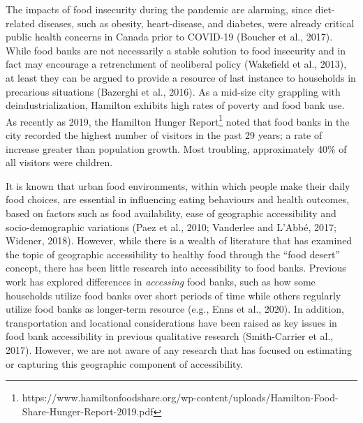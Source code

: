 \documentclass[]{elsarticle} %
\begin{document}
The impacts of food insecurity during the pandemic are alarming, since
diet-related diseases, such as obesity, heart-disease, and diabetes,
were already critical public health concerns in Canada prior to COVID-19
(Boucher et al., 2017). While food banks are not necessarily a stable
solution to food insecurity and in fact may encourage a retrenchment of
neoliberal policy (Wakefield et al., 2013), at least they can be argued
to provide a resource of last instance to households in precarious
situations (Bazerghi et al., 2016). As a mid-size city grappling with
deindustrialization, Hamilton exhibits high rates of poverty and food
bank use. As recently as 2019, the Hamilton Hunger Report\footnote{https://www.hamiltonfoodshare.org/wp-content/uploads/Hamilton-Food-Share-Hunger-Report-2019.pdf}
noted that food banks in the city recorded the highest number of
visitors in the past 29 years; a rate of increase greater than
population growth. Most troubling, approximately 40\% of all visitors
were children.

It is known that urban food environments, within which people make their
daily food choices, are essential in influencing eating behaviours and
health outcomes, based on factors such as food availability, ease of
geographic accessibility and socio-demographic variations (Paez et al.,
2010; Vanderlee and L'Abbé, 2017; Widener, 2018). However, while there
is a wealth of literature that has examined the topic of geographic
accessibility to healthy food through the ``food desert'' concept, there
has been little research into accessibility to food banks. Previous work
has explored differences in \emph{accessing} food banks, such as how
some households utilize food banks over short periods of time while
others regularly utilize food banks as longer-term resource (e.g., Enns
et al., 2020). In addition, transportation and locational considerations
have been raised as key issues in food bank accessibility in previous
qualitative research (Smith-Carrier et al., 2017). However, we are not
aware of any research that has focused on estimating or capturing this
geographic component of accessibility.
\end{document}
